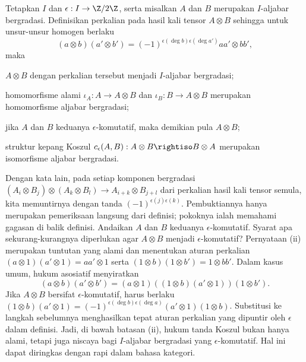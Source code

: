 \begin{definition-theorem}\label{def:Koszul-sign-alg}
	Tetapkan $I$ dan $\epsilon: I \to \Z/2\Z$, serta misalkan $A$ dan $B$ merupakan $I$-aljabar bergradasi. Definisikan perkalian pada hasil kali tensor $A \otimes B$ sehingga untuk unsur-unsur homogen berlaku
	\[ (a \otimes b)(a' \otimes b') = (-1)^{\epsilon(\deg b)\epsilon(\deg a')} aa' \otimes bb' , \]
	maka
	\begin{compactenum}[(i)]
		\item $A \otimes B$ dengan perkalian tersebut menjadi $I$-aljabar bergradasi;
		\item homomorfisme alami $\iota_A: A \to A \otimes B$ dan $\iota_B: B \to A \otimes B$ merupakan homomorfisme aljabar bergradasi;
		\item jika $A$ dan $B$ keduanya $\epsilon$-komutatif, maka demikian pula $A \otimes B$;
		\item struktur kepang Koszul $c_\epsilon(A, B): A \otimes B \rightiso B \otimes A$ merupakan isomorfisme aljabar bergradasi.
	\end{compactenum}
\end{definition-theorem}
Dengan kata lain, pada setiap komponen bergradasi $(A_i \otimes B_j) \otimes (A_k \otimes B_l) \to A_{i+k} \otimes B_{j+l}$ dari perkalian hasil kali tensor semula, kita memuntirnya dengan tanda $(-1)^{\epsilon(j)\epsilon(k)}$. Pembuktiannya hanya merupakan pemeriksaan langsung dari definisi; pokoknya ialah memahami gagasan di balik definisi. Andaikan $A$ dan $B$ keduanya $\epsilon$-komutatif. Syarat apa sekurang-kurangnya diperlukan agar $A \otimes B$ menjadi $\epsilon$-komutatif? Pernyataan (ii) merupakan tuntutan yang alami dan menentukan aturan perkalian $(a \otimes 1)(a' \otimes 1) = aa' \otimes 1$ serta $(1 \otimes b)(1 \otimes b') = 1 \otimes bb'$. Dalam kasus umum, hukum asosiatif menyiratkan
\[ (a \otimes b)(a' \otimes b') = (a \otimes 1) \left((1 \otimes b)(a' \otimes 1)\right) (1 \otimes b'). \]
Jika $A \otimes B$ bersifat $\epsilon$-komutatif, harus berlaku $(1 \otimes b)(a' \otimes 1) = (-1)^{\epsilon(\deg b)\epsilon(\deg a)} (a' \otimes 1)(1 \otimes b)$. Substitusi ke langkah sebelumnya menghasilkan tepat aturan perkalian yang dipuntir oleh $\epsilon$ dalam definisi. Jadi, di bawah batasan (ii), hukum tanda Koszul bukan hanya alami, tetapi juga niscaya bagi $I$-aljabar bergradasi yang $\epsilon$-komutatif. Hal ini dapat diringkas dengan rapi dalam bahasa kategori.

